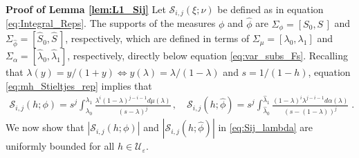 \documentclass[english,12pt,jmp,graphicx]{revtex4-1}
\newcommand{\ph}{\hat{\phi}}
\begin{document}
\noindent\textbf{Proof of Lemma \ref{lem:L1_Sij} }
Let $\mathcal{S}_{i,j}(\xi;\nu)$ be defined as in equation
\eqref{eq:Integral_Reps}. The supports of the measures $\phi$ and $\ph$
are $\Sigma_\phi=[S_0,S\,]$ and $\Sigma_{\ph}=[\hat{S}_0,\hat{S}\,]$, respectively,
which are defined in terms of $\Sigma_\mu=[\lambda_0,\lambda_1]$ and
$\Sigma_\alpha=[\hat{\lambda}_0,\hat{\lambda}_1]$, respectively, directly below equation
\eqref{eq:var_subs_Fs}. Recalling that $\lambda(y)=y/(1+y)\iff y(\lambda)=\lambda/(1-\lambda)$
and $s=1/(1-h)$, equation \eqref{eq:mh_Stieltjes_rep} implies that
%
\begin{align}\label{eq:Sij_lambda}
  \mathcal{S}_{i,j}(h;\phi)=s^j\int_{\lambda_0}^{\lambda_1}\frac{\lambda^i(1-\lambda)^{j-i-1}d\mu(\lambda)}{(s-\lambda)^j}\,,
  \quad 
\mathcal{S}_{i,j}(h;\ph)=s^j\int_{\hat{\lambda}_0}^{\hat{\lambda}_1}\frac{(1-\lambda)^i\lambda^{j-i-1}d\alpha(\lambda)}{(s-(1-\lambda))^j}\;.    
\end{align}
%
We now show that $|\mathcal{S}_{i,j}(h;\phi)|$ and
$|\mathcal{S}_{i,j}(h;\ph)|$ in \eqref{eq:Sij_lambda} are uniformly
bounded for all $h\in\mathcal{U}_\varepsilon$.
\end{document}
